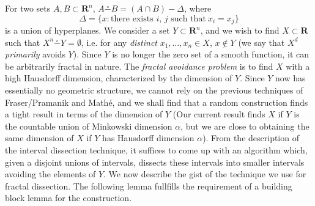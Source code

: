 \documentclass{report}
\theoremstyle{plain}
\theoremstyle{plain}
\begin{document}
 For two sets $A, B \subset \mathbf{R}^n$, $A \overset{\circ}{-} B = (A \cap B) - \Delta$, where
 \[ \Delta = \{ x: \text{there exists $i$, $j$ such that}\ x_i = x_j \} \]
 is a union of hyperplanes. We consider a set $Y \subset \mathbf{R}^n$, and we wish to find $X \subset \mathbf{R}$ such that $X^n \overset{\circ}{-} Y = \emptyset$, i.e. for any {\it distinct} $x_1, \dots, x_n \in X$, $x \not \in Y$ (we say that $X^d$ {\it primarily} avoids $Y$). Since $Y$ is no longer the zero set of a smooth function, it can be arbitrarily fractal in nature. The {\it fractal avoidance problem} is to find $X$ with a high Hausdorff dimension, characterized by the dimension of $Y$. Since $Y$ now has essentially no geometric structure, we cannot rely on the previous techniques of Fraser/Pramanik and Math\'{e}, and we shall find that a random construction finds a tight result in terms of the dimension of $Y$ (Our current result finds $X$ if $Y$ is the countable union of Minkowski dimension $\alpha$, but we are close to obtaining the same dimension of $X$ if $Y$ has Hausdorff dimension $\alpha$). From the description of the interval dissection technique, it suffices to come up with an algorithm which, given a disjoint unions of intervals, dissects these intervals into smaller intervals avoiding the elements of $Y$. We now describe the gist of the technique we use for fractal dissection. The following lemma fullfills the requirement of a building block lemma for the construction.
\end{document}
